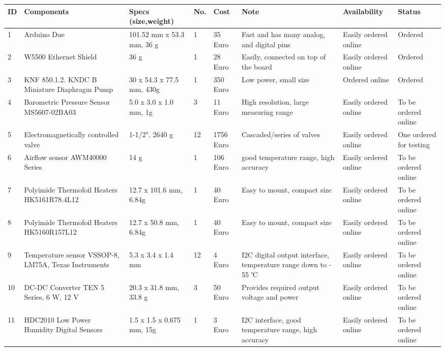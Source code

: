 


\begin{longtable}{|m{}|m{}|m{}|m{}|m{}|m{}|m{}|m{}|}
    
\hline
\textbf{ID} & \textbf{Components} & \textbf{Specs (size,weight)} & \textbf{No.} & \textbf{Cost} & \textbf{Note} & \textbf{Availability} & \textbf{Status} \\ 
\hline
1 & Arduino Due & 101.52 mm x 53.3 mm, 36 g & 1 & 35 Euro & Fast and has many analog, and digital pins & Easily ordered online & Ordered \\ \hline
2 & W5500 Ethernet Shield  & 36 g & 1 & 28 Euro & Easily, connected on top of the board & Easily ordered online & Ordered \\ \hline
3 & KNF 850.1.2. KNDC B Miniature Diaphragm Pump & 30 x 54.3 x 77.5 mm, 430g  & 1 & 350 Euro & Low power, small size & Ordered online & Ordered \\ \hline
4 & Barometric Pressure Sensor MS5607-02BA03 & 5.0 x 3.0 x 1.0 mm, 1g  & 3 &  11 Euro & High resolution, large measuring range & Easily ordered online & To be ordered online \\ \hline
5 & Electromagnetically controlled valve & 1-1/2", 2640 g & 12 & 1756 Euro & Cascaded/series of valves & Easily ordered online & One ordered for testing \\ \hline
6 & Airflow sensor AWM40000 Series & 14 g & 1 & 106 Euro & good temperature range, high accuracy & Easily ordered online & To be ordered online \\ \hline
7 & Polyimide Thermofoil Heaters HK5161R78.4L12 & 12.7 x 101.6 mm, 6.84g & 1 & 40 Euro & Easy to mount, compact size & Easily ordered online & To be ordered online \\ \hline
8 & Polyimide Thermofoil Heaters HK5160R157L12 & 12.7 x 50.8 mm, 6.84g & 1 & 40 Euro & Easy to mount, compact size & Easily ordered online & To be ordered online \\ \hline
9 & Temperature sensor VSSOP-8, LM75A, Texas Instruments & 5.3 x 3.4 x 1.4 mm & 12 & 4 Euro & I2C digital output interface, temperature range down to - 55 ℃ & Easily ordered online & To be ordered online \\ \hline
10 & DC-DC Converter TEN 5 Series, 6 W, 12 V & 20.3 x 31.8 mm, 33.8 g & 3 & 50 Euro & Provides required output voltage and power & Easily ordered online & To be ordered online \\ \hline
11 & HDC2010 Low Power Humidity Digital Sensors & 1.5 x 1.5 x 0.675 mm, 15g & 1 & 3 Euro & I2C interface, good temperature range, high accuracy & Easily ordered online & To be ordered online \\ \hline

\end{longtable}
